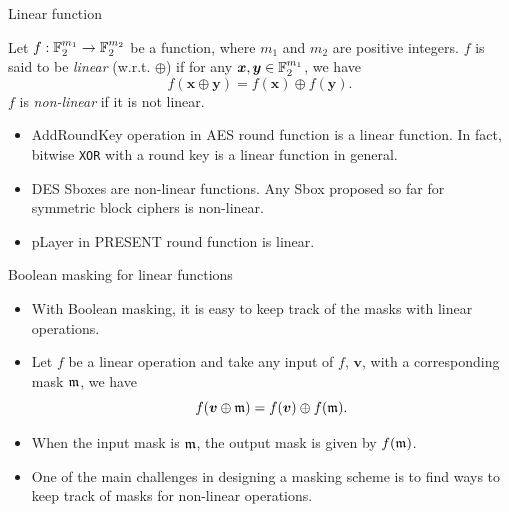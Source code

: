 \begin{frame}{Linear function}
    \begin{definition}
    Let $f:{\mathbb F}_2^{m_1}\to{\mathbb F}_2^{m_2}$ be a function, where $m_1$ and $m_2$ are positive integers.
$f$ is said to be \textit{linear} (w.r.t. $\oplus$) if for any $\boldsymbol{x},\boldsymbol{y}\in{\mathbb F}_2^{m_1}$, we have
\[
    f(\boldsymbol{x}\oplus\boldsymbol{y})=f(\boldsymbol{x})\oplus f(\boldsymbol{y}).
\]
$f$ is \textit{non-linear} if it is not linear.
\end{definition}
\begin{example}
    \begin{itemize}
        \item AddRoundKey operation in AES round function is a linear function. In fact, bitwise \texttt{XOR} with a round key is a linear function in general.
        \item DES Sboxes are non-linear functions.
        Any Sbox proposed so far for symmetric block ciphers is non-linear.
        \item pLayer in PRESENT round function is linear.
    \end{itemize}
\end{example}
\end{frame}

\begin{frame}{Boolean masking for linear functions}
    \begin{itemize}
        \item With Boolean masking, it is easy to keep track of the masks with linear operations.
       \item Let $f$ be a linear operation and take any input of $f$, $\boldsymbol{v}$, with a corresponding mask ${\mathfrak m}$, we have
\[
f(\boldsymbol{v}\oplus{\mathfrak m})=f(\boldsymbol{v})\oplus f({\mathfrak m}).
\]
\item When the input mask is ${\mathfrak m}$, the output mask is given by $f({\mathfrak m})$.
\item One of the main challenges in designing a masking scheme is to find ways to keep track of masks for non-linear operations.
    \end{itemize}
\end{frame}


